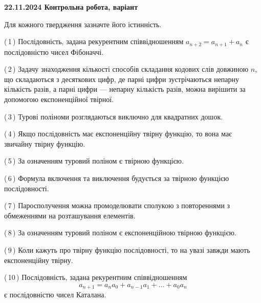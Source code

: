 \documentclass[12pt, ukrainian]{article}
\begin{document}
\begin {large}
\begin {large}
\begin {large}
\begin {large}
\begin {large}
\begin {large}
\begin {large}
\begin {large}
\begin {large}
\begin {large}
\begin {large}
\begin {large}
\begin {large}
\begin {large}
\begin {large}
\begin {large}
\begin {large}
\begin {large}

\textbf{22.11.2024 Контрольна робота, варіант  }\par


{
Для кожного твердження зазначте його істинність.\par

\vspace{2mm}

(\,1\,) Послідовність, задана рекурентним співвідношенням $a_{n+2}=a_{n+1}+a_{n}$ є послідовністю чисел Фібоначчі.%



(\,2\,) Задачу знаходження кількості способів складання кодових слів довжиною $n$, що складаються з десяткових цифр, де парні цифри зустрічаються непарну кількість разів, а парні цифри — непарну кількість разів, можна вирішити за допомогою експоненційної твірної.%



(\,3\,) Турові поліноми розглядаються виключно для квадратних дошок.%



(\,4\,) Якщо послідовність має експоненційну твірну функцію, то вона має звичайну твірну функцію.%



(\,5\,) За означенням туровий поліном є твірною функцією.%



(\,6\,) Формула включення та виключення будується за твірною функцією послідовності.%



(\,7\,) Паросполучення можна промоделювати сполукою з повтореннями з обмеженнями на розташування елементів.%



(\,8\,) За означенням туровий поліном є експоненційною твірною функцією.%



(\,9\,) Коли кажуть про твірну функцію послідовності, то на увазі завжди мають експоненційну твірну.%



(\,10\,) Послідовність, задана рекурентним співвідношенням $$a_{n+1}=a_{n}a_{0}+a_{n-1}a_{1}+\ldots+a_0a_{n}$$ є послідовністю чисел Каталана.%




\vspace{5mm}
}
\newpage

\begin {large}


\end{large}
\end{large}
\end{large}
\end{large}
\end{large}
\end{large}
\end{large}
\end{large}
\end{large}
\end{large}
\end{large}
\end{large}
\end{large}
\end{large}
\end{large}
\end{large}
\end{large}
\end{large}
\end{large}
\end{document}
